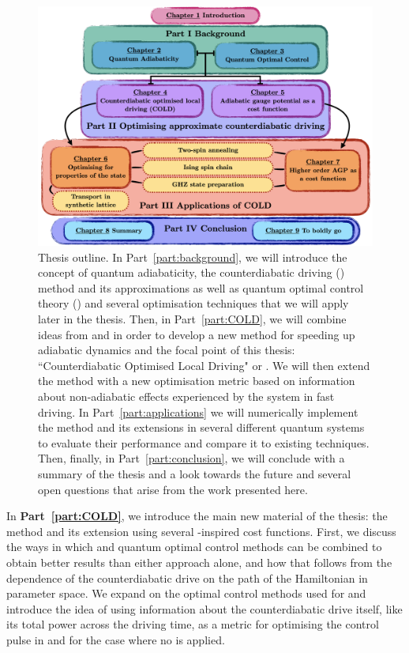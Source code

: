 \begin{figure}[t!]
    \centering
    \includegraphics[width=\linewidth]{images/thesis_overview.png} \caption[Thesis outline.]{Thesis outline. In Part~\ref{part:background}, we will introduce the concept of quantum adiabaticity, the counterdiabatic driving () method and its approximations as well as quantum optimal control theory () and several optimisation techniques that we will apply later in the thesis. Then, in Part~\ref{part:COLD}, we will combine ideas from  and  in order to develop a new method for speeding up adiabatic dynamics and the focal point of this thesis: ``Counterdiabatic Optimised Local Driving" or . We will then extend the method with a new optimisation metric based on information about non-adiabatic effects experienced by the system in fast driving. In Part~\ref{part:applications} we will numerically implement the  method and its extensions in several different quantum systems to evaluate their performance and compare it to existing techniques. Then, finally, in Part~\ref{part:conclusion}, we will conclude with a summary of the thesis and a look towards the future and several open questions that arise from the work presented here.}\label{fig:thesis_overview}
\end{figure}

In \textbf{Part~\ref{part:COLD}}, we introduce the main new material of the thesis: the  method and its extension using several -inspired cost functions. First, we discuss the ways in which  and quantum optimal control methods can be combined to obtain better results than either approach alone, and how that follows from the dependence of the counterdiabatic drive on the path of the Hamiltonian in parameter space. We expand on the optimal control methods used for  and introduce the idea of using information about the counterdiabatic drive itself, like its total power across the driving time, as a metric for optimising the control pulse in  and for the case where no  is applied. 

